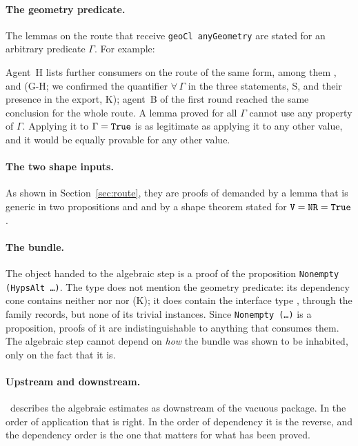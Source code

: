 \paragraph{The geometry predicate.} The lemmas on the route that receive \texttt{geoCl anyGeometry} are stated for an arbitrary predicate $\Gamma$. For example:


Agent~H lists further consumers on the route of the same form, among them ,  and  (\textsf{G-H}; we confirmed the quantifier $\forall\,\Gamma$ in the three statements, \textsf{S}, and their presence in the export, \textsf{K}); agent~B of the first round reached the same conclusion for the whole route.
A lemma proved for all $\Gamma$ cannot use any property of $\Gamma$. Applying it to $\Gamma = \text{\texttt{True}}$ is as legitimate as applying it to any other value, and it would be equally provable for any other value.

\paragraph{The two shape inputs.} As shown in Section~\ref{sec:route}, they are proofs of  demanded by a lemma that is generic in two propositions  and  and by a shape theorem stated for $\text{\texttt{V}} = \text{\texttt{NR}} = \text{\texttt{True}}$.

\paragraph{The bundle.} The object handed to the algebraic step is a proof of the proposition \texttt{Nonempty (HypsAlt …)}.
The type  does not mention the geometry predicate: its dependency cone contains neither  nor  nor  (\textsf{K}); it does contain the interface type , through the family records, but none of its trivial instances.
Since \texttt{Nonempty (…)} is a proposition, proofs of it are indistinguishable to anything that consumes them. The algebraic step cannot depend on \emph{how} the bundle was shown to be inhabited, only on the fact that it is.


\paragraph{Upstream and downstream.} \N\ describes the algebraic estimates as downstream of the vacuous package. In the order of application that is right. In the order of dependency it is the reverse, and the dependency order is the one that matters for what has been proved.

